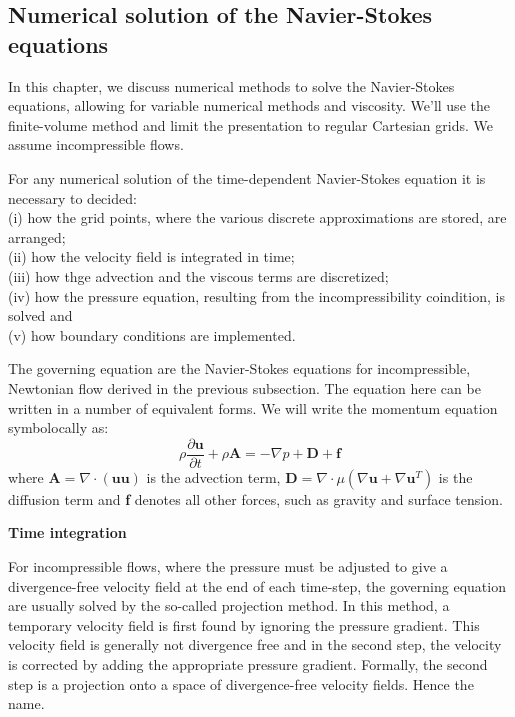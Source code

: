 \documentclass[11pt]{article} %
\begin{document}
\subsection{Numerical solution of the Navier-Stokes equations}
\hspace{3mm} In this chapter, we discuss numerical methods to solve the Navier-Stokes equations, allowing for variable numerical methods and viscosity. We'll use the finite-volume method and limit the presentation to regular Cartesian grids. We assume incompressible flows.\par
For any numerical solution of the time-dependent Navier-Stokes equation it is necessary to decided:\\
(i) how the grid points, where the various discrete approximations are stored, are arranged;\\
(ii) how the velocity field is integrated in time;\\
(iii) how thge advection and the viscous terms are discretized; \\
(iv) how the pressure equation, resulting from the incompressibility coindition, is solved and \\
(v) how boundary conditions are implemented. \par
The governing equation are the Navier-Stokes equations for incompressible, Newtonian flow derived in the previous subsection. The equation here can be written in a number of equivalent forms. We will write the momentum equation symbolocally as:
\begin{equation}
\rho\frac{\partial {\textbf{u}}}{\partial t} + \rho \textbf{A} = -\nabla p+\textbf{D} +\textbf{f}
\end{equation}
where $\textbf{A}=\nabla \cdot (\textbf{uu})$ is the advection term, $\textbf{D} =\nabla \cdot \mu(\nabla \textbf{u}+\nabla\textbf{u}^{T}) $ is the diffusion term and \textbf{f} denotes all other forces, such as gravity and surface tension.\par
\vspace{3mm}
\textbf{Time integration}\par
For incompressible flows, where the pressure must be adjusted to give a divergence-free velocity field at the end of each time-step, the governing equation are usually solved by the so-called projection method. In this method, a temporary velocity field is first found by ignoring the pressure gradient. This velocity field is generally not divergence free and in the second step, the velocity is corrected by adding the appropriate pressure gradient. Formally, the second step is a projection onto a space of divergence-free velocity fields. Hence the name. \par
\end{document}
